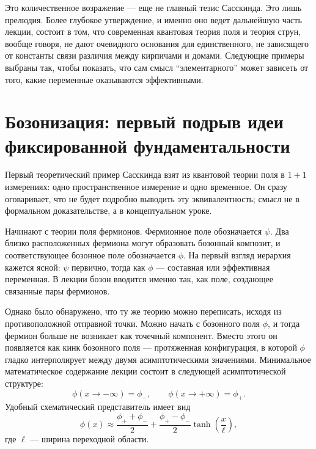 Это количественное возражение — еще не главный тезис Сасскинда. Это лишь прелюдия. Более глубокое утверждение, и именно оно ведет дальнейшую часть лекции, состоит в том, что современная квантовая теория поля и теория струн, вообще говоря, не дают очевидного основания для единственного, не зависящего от константы связи различия между кирпичами и домами. Следующие примеры выбраны так, чтобы показать, что сам смысл ``элементарного'' может зависеть от того, какие переменные оказываются эффективными.

\section{Бозонизация: первый подрыв идеи фиксированной фундаментальности}

Первый теоретический пример Сасскинда взят из квантовой теории поля в \(1+1\) измерениях: одно пространственное измерение и одно временное. Он сразу оговаривает, что не будет подробно выводить эту эквивалентность; смысл не в формальном доказательстве, а в концептуальном уроке.

Начинают с теории поля фермионов. Фермионное поле обозначается \(\psi\). Два близко расположенных фермиона могут образовать бозонный композит, и соответствующее бозонное поле обозначается \(\phi\). На первый взгляд иерархия кажется ясной: \(\psi\) первично, тогда как \(\phi\) — составная или эффективная переменная. В лекции бозон вводится именно так, как поле, создающее связанные пары фермионов.

Однако было обнаружено, что ту же теорию можно переписать, исходя из противоположной отправной точки. Можно начать с бозонного поля \(\phi\), и тогда фермион больше не возникает как точечный компонент. Вместо этого он появляется как кинк бозонного поля — протяженная конфигурация, в которой \(\phi\) гладко интерполирует между двумя асимптотическими значениями. Минимальное математическое содержание лекции состоит в следующей асимптотической структуре:
\begin{equation}
\phi(x\to -\infty)=\phi_-,
\qquad
\phi(x\to +\infty)=\phi_+.
\end{equation}
Удобный схематический представитель имеет вид
\begin{equation}
\phi(x)\approx \frac{\phi_++\phi_-}{2}
+
\frac{\phi_+-\phi_-}{2}\tanh\!\left(\frac{x}{\ell}\right),
\end{equation}
где \(\ell\) — ширина переходной области.


